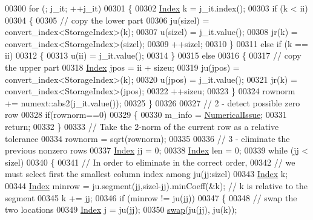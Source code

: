 \begin{DoxyCode}
00300     \textcolor{keywordflow}{for} (; j\_it; ++j\_it)
00301     \{
00302       \hyperlink{namespace_eigen_a62e77e0933482dafde8fe197d9a2cfde}{Index} k = j\_it.index();
00303       \textcolor{keywordflow}{if} (k < ii)
00304       \{
00305         \textcolor{comment}{// copy the lower part}
00306         ju(sizel) = convert\_index<StorageIndex>(k);
00307         u(sizel) = j\_it.value();
00308         jr(k) = convert\_index<StorageIndex>(sizel);
00309         ++sizel;
00310       \}
00311       \textcolor{keywordflow}{else} \textcolor{keywordflow}{if} (k == ii)
00312       \{
00313         u(ii) = j\_it.value();
00314       \}
00315       \textcolor{keywordflow}{else}
00316       \{
00317         \textcolor{comment}{// copy the upper part}
00318         \hyperlink{namespace_eigen_a62e77e0933482dafde8fe197d9a2cfde}{Index} jpos = ii + sizeu;
00319         ju(jpos) = convert\_index<StorageIndex>(k);
00320         u(jpos) = j\_it.value();
00321         jr(k) = convert\_index<StorageIndex>(jpos);
00322         ++sizeu;
00323       \}
00324       rownorm += numext::abs2(j\_it.value());
00325     \}
00326 
00327     \textcolor{comment}{// 2 - detect possible zero row}
00328     \textcolor{keywordflow}{if}(rownorm==0)
00329     \{
00330       m\_info = \hyperlink{group__enums_gga85fad7b87587764e5cf6b513a9e0ee5eaaf9b736d310a664e7729d163a035cc5f}{NumericalIssue};
00331       \textcolor{keywordflow}{return};
00332     \}
00333     \textcolor{comment}{// Take the 2-norm of the current row as a relative tolerance}
00334     rownorm = sqrt(rownorm);
00335 
00336     \textcolor{comment}{// 3 - eliminate the previous nonzero rows}
00337     \hyperlink{namespace_eigen_a62e77e0933482dafde8fe197d9a2cfde}{Index} jj = 0;
00338     \hyperlink{namespace_eigen_a62e77e0933482dafde8fe197d9a2cfde}{Index} len = 0;
00339     \textcolor{keywordflow}{while} (jj < sizel)
00340     \{
00341       \textcolor{comment}{// In order to eliminate in the correct order,}
00342       \textcolor{comment}{// we must select first the smallest column index among  ju(jj:sizel)}
00343       \hyperlink{namespace_eigen_a62e77e0933482dafde8fe197d9a2cfde}{Index} k;
00344       \hyperlink{namespace_eigen_a62e77e0933482dafde8fe197d9a2cfde}{Index} minrow = ju.segment(jj,sizel-jj).minCoeff(&k); \textcolor{comment}{// k is relative to the segment}
00345       k += jj;
00346       \textcolor{keywordflow}{if} (minrow != ju(jj))
00347       \{
00348         \textcolor{comment}{// swap the two locations}
00349         \hyperlink{namespace_eigen_a62e77e0933482dafde8fe197d9a2cfde}{Index} j = ju(jj);
00350         \hyperlink{endian_8c_a3ca5ecd34b04d6a243c054ac3a57f68d}{swap}(ju(jj), ju(k));

\end{DoxyCode}
